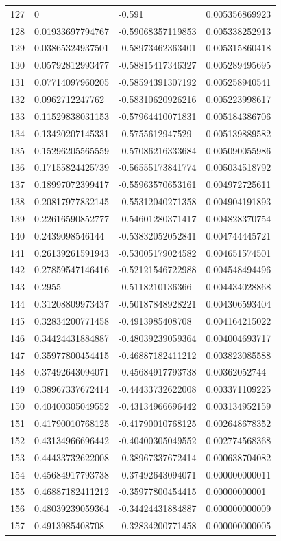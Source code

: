 \documentclass{amsart}
\numberwithin{equation}{section}
\numberwithin{table}{section}
\begin{document}
\begin{longtable}{@{}rlll@{}}
127 & 0 & -0.591 & 0.005356869923 \\
128 & 0.01933697794767 & -0.59068357119853 & 0.005338252913 \\
129 & 0.03865324937501 & -0.58973462363401 & 0.005315860418 \\
130 & 0.05792812993477 & -0.58815417346327 & 0.005289495695 \\
131 & 0.07714097960205 & -0.58594391307192 & 0.005258940541 \\
132 & 0.0962712247762 & -0.58310620926216 & 0.005223998617 \\
133 & 0.11529838031153 & -0.57964410071831 & 0.005184386706 \\
134 & 0.13420207145331 & -0.5755612947529 & 0.005139889582 \\
135 & 0.15296205565559 & -0.57086216333684 & 0.005090055986 \\
136 & 0.17155824425739 & -0.56555173841774 & 0.005034518792 \\
137 & 0.18997072399417 & -0.55963570653161 & 0.004972725611 \\
138 & 0.20817977832145 & -0.55312040271358 & 0.004904191893 \\
139 & 0.22616590852777 & -0.54601280371417 & 0.004828370754 \\
140 & 0.2439098546144 & -0.53832052052841 & 0.004744445721 \\
141 & 0.26139261591943 & -0.53005179024582 & 0.004651574501 \\
142 & 0.27859547146416 & -0.52121546722988 & 0.004548494496 \\
143 & 0.2955 & -0.5118210136366 & 0.004434028868 \\
144 & 0.31208809973437 & -0.50187848928221 & 0.004306593404 \\
145 & 0.32834200771458 & -0.4913985408708 & 0.004164215022 \\
146 & 0.34424431884887 & -0.48039239059364 & 0.004004693717 \\
147 & 0.35977800454415 & -0.46887182411212 & 0.003823085588 \\
148 & 0.37492643094071 & -0.45684917793738 & 0.00362052744 \\
149 & 0.38967337672414 & -0.44433732622008 & 0.003371109225 \\
150 & 0.40400305049552 & -0.43134966696442 & 0.003134952159 \\
151 & 0.41790010768125 & -0.41790010768125 & 0.002648678352 \\
152 & 0.43134966696442 & -0.40400305049552 & 0.002774568368 \\
153 & 0.44433732622008 & -0.38967337672414 & 0.000638704082 \\
154 & 0.45684917793738 & -0.37492643094071 & 0.000000000011 \\
155 & 0.46887182411212 & -0.35977800454415 & 0.00000000001 \\
156 & 0.48039239059364 & -0.34424431884887 & 0.000000000009 \\
157 & 0.4913985408708 & -0.32834200771458 & 0.000000000005 \\
\hline
\end{longtable}
\end{document}
